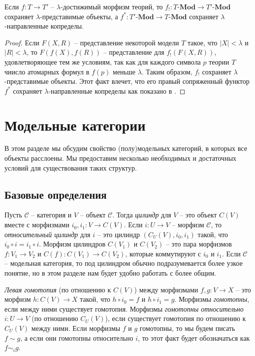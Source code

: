 \documentclass[reqno]{amsart}
\theoremstyle{definition}
\theoremstyle{remark}
\newcommand{\bcat}[1]{\mathbf{#1}}
\newcommand{\cat}[1]{\mathcal{#1}}
\renewcommand{\C}{\cat{C}}
\newcommand{\Mod}[1]{#1\text{-}\bcat{Mod}}
\newcommand{\cyli}{i}
\begin{document}
\begin{lem}
Если $f : T \to T'$ -- $\lambda$-достижимый морфизм теорий, то $f_! : \Mod{T} \to \Mod{T'}$ сохраняет $\lambda$-представимые объекты, а $f^* : \Mod{T'} \to \Mod{T}$ сохраняет $\lambda$-направленные копределы.
\end{lem}
\begin{proof}
Если $F(X,R)$ -- представление некоторой модели $T$ такое, что $|X| < \lambda$ и $|R| < \lambda$, то $F(f(X),f(R))$ -- представление для $f_!(F(X,R))$, удовлетворяющее тем же условиям,
так как для каждого символа $p$ теории $T$ чиисло атомарных формул в $f(p)$ меньше $\lambda$.
Таким образом, $f_!$ сохраняет $\lambda$-представимые объекты.
Этот факт влечет, что его правый сопряженный функтор $f^*$ сохраняет $\lambda$-направленные копределы как показано в \cite[Theorem~1.66]{LPC}.
\end{proof}

\section{Модельные категории}

В этом разделе мы обсудим свойство (полу)модельных категорий, в которых все объекты расслоены.
Мы предоставим несколько необходимых и достаточных условий для существования таких структур.

\subsection{Базовые определения}

Пусть $\C$ -- категория и $V$ -- объект $\C$.
Тогда \emph{цилиндр} для $V$ -- это объект $C(V)$ вместе с морфизмами $\cyli_0,\cyli_1 : V \to C(V)$.
Если $i : U \to V$ -- морфизм $\C$, то \emph{относительный цилиндр} для $i$ -- это цилиндр $(C_U(V),\cyli_0,\cyli_1)$ такой, что $\cyli_0 \circ i = \cyli_1 \circ i$.
Морфизм цилиндров $C(V_1)$ и $C(V_2)$ -- это пара морфизмов $f : V_1 \to V_2$ и $C(f) : C(V_1) \to C(V_2)$, которые коммутируют с $\cyli_0$ и $\cyli_1$.
Если $\C$ -- модельная категория, то под цилиндром обычно подразумевается более узкое понятие, но в этом разделе нам будет удобно работать с более общим.

\emph{Левая гомотопия} (по отношению к $C(V)$) между морфизмами $f,g : V \to X$ -- это морфизм $h : C(V) \to X$ такой, что $h \circ \cyli_0 = f$ и $h \circ \cyli_1 = g$.
Морфизмы \emph{гомотопны}, если между ними существует гомотопия.
Морфизмы \emph{гомотопны относительно $i : U \to V$} (по отношению $C_U(V)$), если существует гомотопия по отношению к $C_U(V)$ между ними.
Если морфизмы $f$ и $g$ гомотопны, то мы будем писать $f \sim g$, а если они гомотопны относительно $i$, то этот факт будет обозначаться как $f \sim_i g$.
\end{document}
